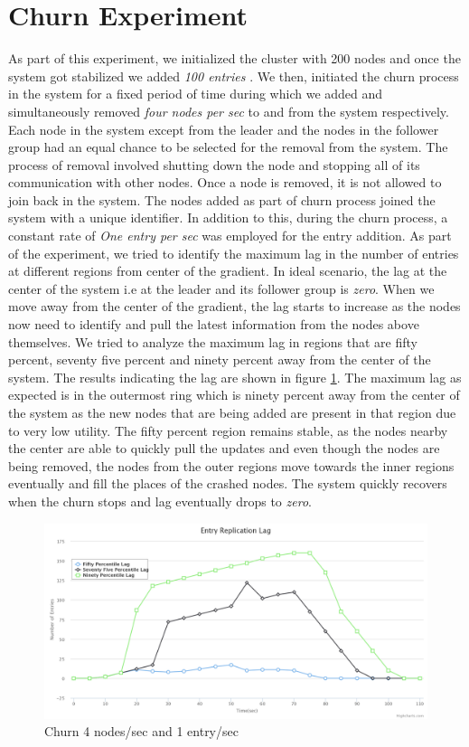 \documentclass[a4paper,11pt]{kth-mag}
\begin{document}
\section{Churn Experiment}
\label{sec:churn}
As part of this experiment, we initialized the cluster with 200 nodes and once the system got stabilized we added \textit{100 entries} . We then, initiated the churn process in the system for a fixed period of time during which we added and simultaneously removed \textit{four nodes per sec} to and from the system respectively. Each node in the system except from the leader and the nodes in the follower group had an equal chance to be selected for the removal from the system. The process of removal involved shutting down the node and stopping all of its communication with other nodes. Once a node is removed, it is not allowed to join back in the system. The nodes added as part of churn process joined the system with a unique identifier. In addition to this, during the churn process, a constant rate of \textit{ One entry per sec} was employed for the entry addition. As part of the experiment, we tried to identify the maximum lag in the number of entries at different regions from center of the gradient. In ideal scenario, the lag at the center of the system i.e at the leader and its follower group is \textit{zero}. When we move away from the center of the gradient, the lag starts to increase as the nodes now need to identify and pull the latest information from the nodes above themselves. We tried to analyze the maximum lag in regions that are fifty percent, seventy five percent and ninety percent away from the center of the system. The results indicating the lag are shown in figure \ref{fig:churn}. The maximum lag as expected is in the outermost ring which is ninety percent away from the center of the system as the new nodes that are being added are present in that region due to very low utility. The fifty percent region remains stable, as the nodes nearby the center are able to quickly pull the updates and even though the nodes are being removed, the nodes from the outer regions move towards the inner regions eventually and fill the places of the crashed nodes. The system quickly recovers when the churn stops and lag eventually drops to \textit{zero}.

\begin{figure}[h]
	\includegraphics[scale=0.20]{Churn200-4Node-1Entry}
	\caption{Churn 4 nodes/sec and 1 entry/sec}
	\label{fig:churn}
\end{figure}
\end{document}

